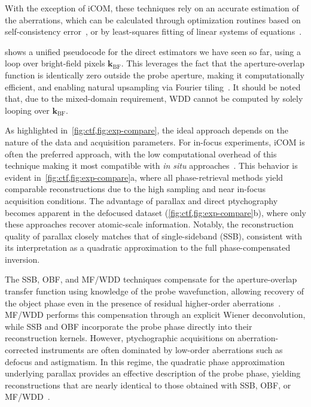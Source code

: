 \documentclass[pdflatex,sn-aps,iicol]{sn-jnl}%
\begin{document}
With the exception of iCOM, these techniques rely on an accurate estimation of the aberrations, which can be calculated through optimization routines based on self-consistency error~\cite{Varnavides_2025}, or by least-squares fitting of linear systems of equations~\cite{Varnavides_2023,Yu_2025}.

 shows a unified pseudocode for the direct estimators we have seen so far, using a loop over bright-field pixels $\boldsymbol{k}_{\mathrm{BF}}$.
This leverages the fact that the aperture-overlap function is identically zero outside the probe aperture, making it computationally efficient, and enabling natural upsampling via Fourier tiling~\cite{Varnavides_2025}.
It should be noted that, due to the mixed-domain requirement, WDD cannot be computed by solely looping over $\boldsymbol{k}_{\mathrm{BF}}$.

As highlighted in~\cref{fig:ctf,fig:exp-compare}, the ideal approach depends on the nature of the data and acquisition parameters.
For in-focus experiments, iCOM is often the preferred approach, with the low computational overhead of this technique making it most compatible with \textit{in situ} approaches~\cite{bekkevold2024ultra}.
This behavior is evident in~\cref{fig:ctf,fig:exp-compare}a, where all phase-retrieval methods yield comparable reconstructions due to the high sampling and near in-focus acquisition conditions.
The advantage of parallax and direct ptychography becomes apparent in the defocused dataset (\cref{fig:ctf,fig:exp-compare}b), where only these approaches recover atomic-scale information.
Notably, the reconstruction quality of parallax closely matches that of single-sideband (SSB), consistent with its interpretation as a quadratic approximation to the full phase-compensated inversion.

The SSB, OBF, and MF/WDD techniques compensate for the aperture-overlap transfer function using knowledge of the probe wavefunction, allowing recovery of the object phase even in the presence of residual higher-order aberrations~\cite{Varnavides_2025,Susi_2025}.
MF/WDD performs this compensation through an explicit Wiener deconvolution, while SSB and OBF incorporate the probe phase directly into their reconstruction kernels.
However, ptychographic acquisitions on aberration-corrected instruments are often dominated by low-order aberrations such as defocus and astigmatism. 
In this regime, the quadratic phase approximation underlying parallax provides an effective description of the probe phase, yielding reconstructions that are nearly identical to those obtained with SSB, OBF, or MF/WDD~\cite{Varnavides_2025_ssnr}.
\end{document}
